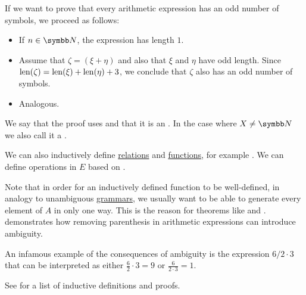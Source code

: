 \begin{remark}
  If we want to prove that every arithmetic expression has an odd number of symbols, we proceed as follows:
  \begin{itemize}
    \item If \( n \in \BN \), the expression has length \( 1 \).
    \item Assume that \( \zeta = (\xi + \eta) \) and also that \( \xi \) and \( \eta \) have odd length. Since \( \operatorname{len}(\zeta) = \operatorname{len}(\xi) + \operatorname{len}(\eta) + 3 \), we conclude that \( \zeta \) also has an odd number of symbols.
    \item Analogous.
  \end{itemize}

  We say that the proof uses  and that it is an . In the case where \( X \neq \BN \) we also call it a .

  We can also inductively define \hyperref[def:relation]{relations} and \hyperref[def:function]{functions}, for example . We can define operations in \( E \) based on .

  Note that in order for an inductively defined function to be well-defined, in analogy to unambiguous \hyperref[def:grammar_derivation/ambiguity]{grammars}, we usually want to be able to generate every element of \( A \) in only one way. This is the reason for theorems like  and .  demonstrates how removing parenthesis in arithmetic expressions can introduce ambiguity.

  An infamous example of the consequences of ambiguity is the expression \( 6 / 2 \cdot 3 \) that can be interpreted as either \( \tfrac 6 2 \cdot 3 = 9 \) or \( \tfrac 6 {2 \cdot 3} = 1 \).

  See  for a list of inductive definitions and proofs.
\end{remark}
